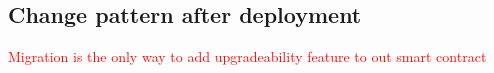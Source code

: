 
 






\subsection{Change pattern after deployment}

\textcolor{red}{Migration is the only way to add upgradeability feature to out smart contract}






